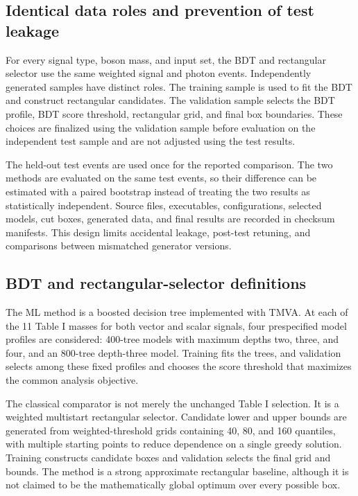 \documentclass[particles,article,submit,moreauthors,pdftex]{Definitions/mdpi}
\begin{document}
\subsection{Identical data roles and prevention of test leakage}\label{sec:4.2}

For every signal type, boson mass, and input set, the BDT and rectangular selector use the same weighted signal and photon events. Independently generated samples have distinct roles. The training sample is used to fit the BDT and construct rectangular candidates. The validation sample selects the BDT profile, BDT score threshold, rectangular grid, and final box boundaries. These choices are finalized using the validation sample before evaluation on the independent test sample and are not adjusted using the test results.

The held-out test events are used once for the reported comparison. The two methods are evaluated on the same test events, so their difference can be estimated with a paired bootstrap instead of treating the two results as statistically independent. Source files, executables, configurations, selected models, cut boxes, generated data, and final results are recorded in checksum manifests. This design limits accidental leakage, post-test retuning, and comparisons between mismatched generator versions.

\subsection{BDT and rectangular-selector definitions}\label{sec:4.3}

The ML method is a boosted decision tree implemented with TMVA. At each of the 11 Table I masses for both vector and scalar signals, four prespecified model profiles are considered: 400-tree models with maximum depths two, three, and four, and an 800-tree depth-three model. Training fits the trees, and validation selects among these fixed profiles and chooses the score threshold that maximizes the common analysis objective.

The classical comparator is not merely the unchanged Table I selection. It is a weighted multistart rectangular selector. Candidate lower and upper bounds are generated from weighted-threshold grids containing 40, 80, and 160 quantiles, with multiple starting points to reduce dependence on a single greedy solution. Training constructs candidate boxes and validation selects the final grid and bounds. The method is a strong approximate rectangular baseline, although it is not claimed to be the mathematically global optimum over every possible box.
\end{document}
